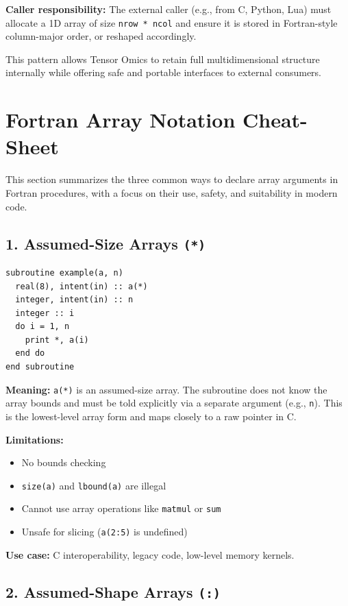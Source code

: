 \documentclass{article}
\begin{document}
\noindent\textbf{Caller responsibility:}
The external caller (e.g., from C, Python, Lua) must allocate a 1D array of size \texttt{nrow * ncol} and ensure it is stored in Fortran-style column-major order, or reshaped accordingly.

\noindent This pattern allows Tensor Omics to retain full multidimensional structure internally while offering safe and portable interfaces to external consumers.

\section{Fortran Array Notation Cheat-Sheet}

This section summarizes the three common ways to declare array arguments in Fortran procedures, with a focus on their use, safety, and suitability in modern code.

\subsection{1. Assumed-Size Arrays \texttt{(*)}}

\begin{verbatim}
subroutine example(a, n)
  real(8), intent(in) :: a(*)
  integer, intent(in) :: n
  integer :: i
  do i = 1, n
    print *, a(i)
  end do
end subroutine
\end{verbatim}

\textbf{Meaning:} \texttt{a(*)} is an assumed-size array. The subroutine does not know the array bounds and must be told explicitly via a separate argument (e.g., \texttt{n}). This is the lowest-level array form and maps closely to a raw pointer in C.

\textbf{Limitations:}
\begin{itemize}
  \item No bounds checking
  \item \texttt{size(a)} and \texttt{lbound(a)} are illegal
  \item Cannot use array operations like \texttt{matmul} or \texttt{sum}
  \item Unsafe for slicing (\texttt{a(2:5)} is undefined)
\end{itemize}

\textbf{Use case:} C interoperability, legacy code, low-level memory kernels.


\subsection{2. Assumed-Shape Arrays \texttt{(:)}}
\end{document}
